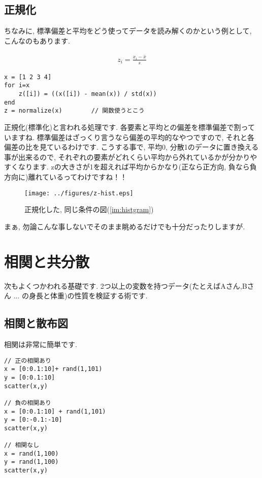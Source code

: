 \documentclass[11pt,a4paper]{ujreport}
\begin{document}
\subsection{正規化}
ちなみに, 標準偏差と平均をどう使ってデータを読み解くのかという例として, こんなのもあります.

\begin{eqnarray}
\label{eq:normalize}
z_i = \frac{x_i - \bar{x}}{s}
\end{eqnarray}



\begin{lstlisting}[caption=式(\ref{eq:normalize})のコード,label=sc:normalize,  keepspaces=true]
x = [1 2 3 4]
for i=x
    z([i]) = ((x([i]) - mean(x)) / std(x))
end
z = normalize(x)        // 関数使うとこう
\end{lstlisting}



正規化(標準化)と言われる処理です. 各要素と平均との偏差を標準偏差で割っていますね. 標準偏差はざっくり言うなら偏差の平均的なやつですので, それと各偏差の比を見ているわけです. こうする事で, 平均0, 分散1のデータに置き換える事が出来るので, それぞれの要素がどれくらい平均から外れているかが分かりやすくなります. zの大きさが1を超えれば平均からかなり(正なら正方向, 負なら負方向に)離れているってわけですね！！\\

\begin{figure}[H]
\label{im:z-hist}
  \centering
  \texttt{[image: ../figures/z-hist.eps]}
  \caption{正規化した, 同じ条件の図(\ref{im:histgram})}
\end{figure}

まぁ, 勿論こんな事しないでそのまま眺めるだけでも十分だったりしますが.

\section{相関と共分散}
次もよくつかわれる基礎です. 2つ以上の変数を持つデータ(たとえばAさん,Bさん ... の身長と体重)の性質を検証する術です. \\
\subsection{相関と散布図}
相関は非常に簡単です. 
\begin{lstlisting}[caption=図(\ref{im:scatter})のコード,label=sc:scatter]
// 正の相関あり
x = [0:0.1:10]+ rand(1,101)
y = [0:0.1:10]
scatter(x,y)

// 負の相関あり
x = [0:0.1:10] + rand(1,101)
y = [0:-0.1:-10]
scatter(x,y)

// 相関なし
x = rand(1,100)
y = rand(1,100)
scatter(x,y)
\end{lstlisting}
\end{document}
